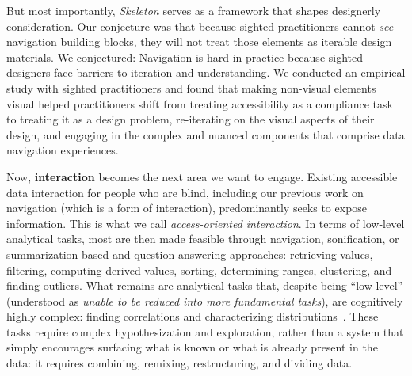 \documentclass[12pt]{cmuthesis}
\begin{document}
But most importantly, \textit{Skeleton} serves as a framework that shapes designerly consideration. Our conjecture was that because sighted practitioners cannot \textit{see} navigation building blocks, they will not treat those elements as iterable design materials. We conjectured: Navigation is hard in practice because sighted designers face barriers to iteration and understanding. We conducted an empirical study with sighted practitioners and found that making non-visual elements visual helped practitioners shift from treating accessibility as a compliance task to treating it as a design problem, re-iterating on the visual aspects of their design, and engaging in the complex and nuanced components that comprise data navigation experiences.


Now, \textbf{interaction} becomes the next area we want to engage. Existing accessible data interaction for people who are blind, including our previous work on navigation (which is a form of interaction), predominantly seeks to expose information. This is what we call \textit{access-oriented interaction}. In terms of low-level analytical tasks, most are then made feasible through navigation, sonification, or summarization-based and question-answering approaches: retrieving values, filtering, computing derived values, sorting, determining ranges, clustering, and finding outliers. What remains are analytical tasks that, despite being ``low level'' (understood as \textit{unable to be reduced into more fundamental tasks}), are cognitively highly complex: finding correlations and characterizing distributions~\cite{Amar2005}. These tasks require complex hypothesization and exploration, rather than a system that simply encourages surfacing what is known or what is already present in the data: it requires combining, remixing, restructuring, and dividing data.
\end{document}
